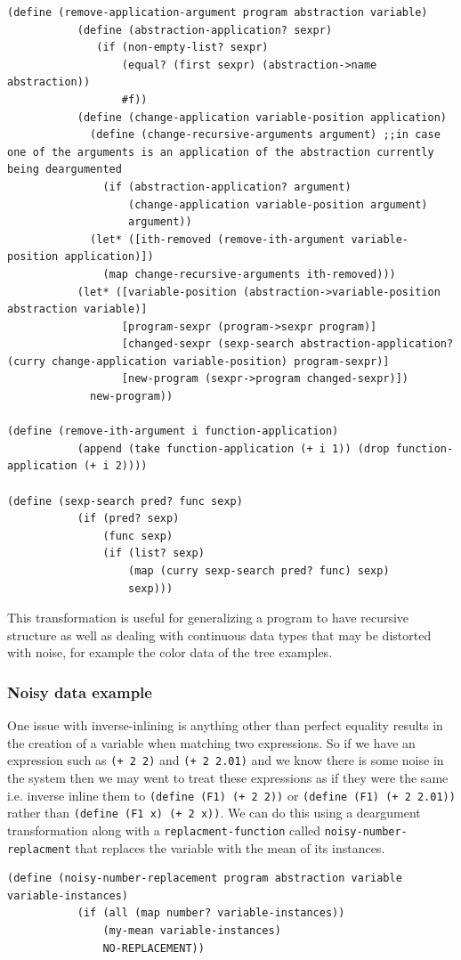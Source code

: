 \documentclass[a4paper,10pt]{article}
\begin{document}
\begin{lstlisting}[frame=trBL]
(define (remove-application-argument program abstraction variable)
           (define (abstraction-application? sexpr)
              (if (non-empty-list? sexpr)
                  (equal? (first sexpr) (abstraction->name abstraction))
                  #f))
           (define (change-application variable-position application)
             (define (change-recursive-arguments argument) ;;in case one of the arguments is an application of the abstraction currently being deargumented
               (if (abstraction-application? argument)
                   (change-application variable-position argument)
                   argument))
             (let* ([ith-removed (remove-ith-argument variable-position application)])
               (map change-recursive-arguments ith-removed)))
           (let* ([variable-position (abstraction->variable-position abstraction variable)]
                  [program-sexpr (program->sexpr program)]
                  [changed-sexpr (sexp-search abstraction-application? (curry change-application variable-position) program-sexpr)]
                  [new-program (sexpr->program changed-sexpr)])
             new-program))

(define (remove-ith-argument i function-application)
           (append (take function-application (+ i 1)) (drop function-application (+ i 2))))

(define (sexp-search pred? func sexp)
           (if (pred? sexp)
               (func sexp)
               (if (list? sexp)
                   (map (curry sexp-search pred? func) sexp)
                   sexp)))
\end{lstlisting}
This transformation is useful for generalizing a program to have recursive structure as well as dealing with continuous data types that may be distorted with noise, for example the color data of the tree examples.

\subsubsection{Noisy data example}
One issue with inverse-inlining is anything other than perfect equality results in the creation of a variable when matching two expressions.  So if we have an expression such as \texttt{(+ 2 2)} and \texttt{(+ 2 2.01)} and we know there is some noise in the system then we may went to treat these expressions as if they were the same i.e. inverse inline them to \texttt{(define (F1) (+ 2 2))} or \texttt{(define (F1) (+ 2 2.01))} rather than \texttt{(define (F1 x) (+ 2 x))}.  We can do this using a deargument transformation along with a \texttt{replacment-function} called \texttt{noisy-number-replacment} that replaces the variable with the mean of its instances.  
\begin{lstlisting}[frame=trBL]
(define (noisy-number-replacement program abstraction variable variable-instances)
           (if (all (map number? variable-instances))
               (my-mean variable-instances)
               NO-REPLACEMENT))
\end{lstlisting}
\end{document}
